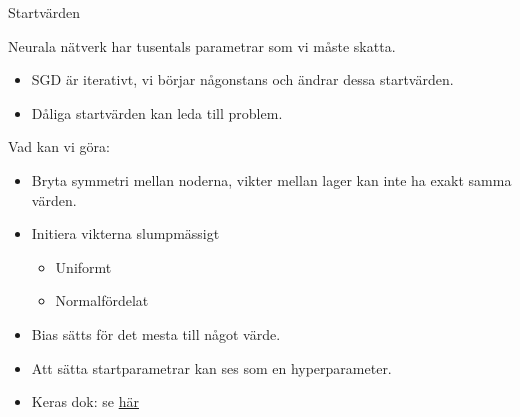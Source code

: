 \documentclass[10pt,english]{beamer}
\begin{document}
\begin{frame}{Startvärden}
    
    Neurala nätverk har tusentals parametrar som vi måste skatta.
    \begin{itemize}
        \item SGD är iterativt, vi börjar någonstans och ändrar dessa startvärden.
        \item Dåliga startvärden kan leda till problem.
    \end{itemize}
    Vad kan vi göra:
    \begin{itemize}
        \item Bryta symmetri mellan noderna, vikter mellan lager kan inte ha exakt samma värden.
        \item Initiera vikterna slumpmässigt
        \begin{itemize}
            \item Uniformt
            \item Normalfördelat
        \end{itemize}
        \item Bias sätts för det mesta till något värde.
        \item Att sätta startparametrar kan ses som en hyperparameter.
        \item Keras dok: se \href{https://keras3.posit.co/reference/index.html\#initializers}{här}
    \end{itemize}

\end{frame}
\end{document}

